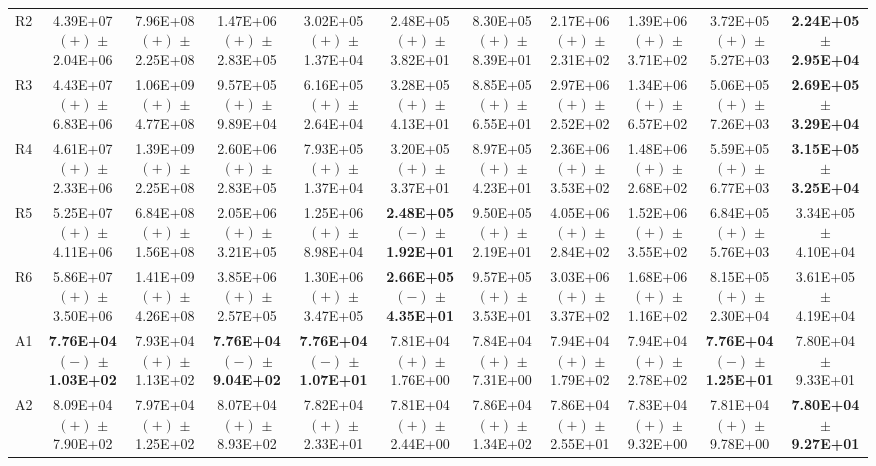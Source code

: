 \begin{table}[t]
{\begin{tabular}{l*{10}{c}}
R2 & 4.39E+07 $(+)$ $\pm$ 2.04E+06 & 7.96E+08 $(+)$ $\pm$ 2.25E+08 & 1.47E+06 $(+)$ $\pm$ 2.83E+05 & 3.02E+05 $(+)$ $\pm$ 1.37E+04 & 2.48E+05 $(+)$ $\pm$ 3.82E+01 & 8.30E+05 $(+)$ $\pm$ 8.39E+01 & 2.17E+06 $(+)$ $\pm$ 2.31E+02 & 1.39E+06 $(+)$ $\pm$ 3.71E+02 & 3.72E+05 $(+)$ $\pm$ 5.27E+03 & \textbf{2.24E+05 $\pm$ 2.95E+04} \\
R3 & 4.43E+07 $(+)$ $\pm$ 6.83E+06 & 1.06E+09 $(+)$ $\pm$ 4.77E+08 & 9.57E+05 $(+)$ $\pm$ 9.89E+04 & 6.16E+05 $(+)$ $\pm$ 2.64E+04 & 3.28E+05 $(+)$ $\pm$ 4.13E+01 & 8.85E+05 $(+)$ $\pm$ 6.55E+01 & 2.97E+06 $(+)$ $\pm$ 2.52E+02 & 1.34E+06 $(+)$ $\pm$ 6.57E+02 & 5.06E+05 $(+)$ $\pm$ 7.26E+03 & \textbf{2.69E+05 $\pm$ 3.29E+04} \\
R4 & 4.61E+07 $(+)$ $\pm$ 2.33E+06 & 1.39E+09 $(+)$ $\pm$ 2.25E+08 & 2.60E+06 $(+)$ $\pm$ 2.83E+05 & 7.93E+05 $(+)$ $\pm$ 1.37E+04 & 3.20E+05 $(+)$ $\pm$ 3.37E+01 & 8.97E+05 $(+)$ $\pm$ 4.23E+01 & 2.36E+06 $(+)$ $\pm$ 3.53E+02 & 1.48E+06 $(+)$ $\pm$ 2.68E+02 & 5.59E+05 $(+)$ $\pm$ 6.77E+03 & \textbf{3.15E+05 $\pm$ 3.25E+04} \\
R5 & 5.25E+07 $(+)$ $\pm$ 4.11E+06 & 6.84E+08 $(+)$ $\pm$ 1.56E+08 & 2.05E+06 $(+)$ $\pm$ 3.21E+05 & 1.25E+06 $(+)$ $\pm$ 8.98E+04 & \textbf{2.48E+05 $(-)$ $\pm$ 1.92E+01} & 9.50E+05 $(+)$ $\pm$ 2.19E+01 & 4.05E+06 $(+)$ $\pm$ 2.84E+02 & 1.52E+06 $(+)$ $\pm$ 3.55E+02 & 6.84E+05 $(+)$ $\pm$ 5.76E+03 & 3.34E+05 $\pm$ 4.10E+04 \\
R6 & 5.86E+07 $(+)$ $\pm$ 3.50E+06 & 1.41E+09 $(+)$ $\pm$ 4.26E+08 & 3.85E+06 $(+)$ $\pm$ 2.57E+05 & 1.30E+06 $(+)$ $\pm$ 3.47E+05 & \textbf{2.66E+05 $(-)$ $\pm$ 4.35E+01} & 9.57E+05 $(+)$ $\pm$ 3.53E+01 & 3.03E+06 $(+)$ $\pm$ 3.37E+02 & 1.68E+06 $(+)$ $\pm$ 1.16E+02 & 8.15E+05 $(+)$ $\pm$ 2.30E+04 & 3.61E+05 $\pm$ 4.19E+04 \\
\midrule
A1 & \textbf{7.76E+04 $(-)$ $\pm$ 1.03E+02} & 7.93E+04 $(+)$ $\pm$ 1.13E+02 & \textbf{7.76E+04 $(-)$ $\pm$ 9.04E+02} & \textbf{7.76E+04 $(-)$ $\pm$ 1.07E+01} & 7.81E+04 $(+)$ $\pm$ 1.76E+00 & 7.84E+04 $(+)$ $\pm$ 7.31E+00 & 7.94E+04 $(+)$ $\pm$ 1.79E+02 & 7.94E+04 $(+)$ $\pm$ 2.78E+02 & \textbf{7.76E+04 $(-)$ $\pm$ 1.25E+01} & 7.80E+04 $\pm$ 9.33E+01 \\
A2 & 8.09E+04 $(+)$ $\pm$ 7.90E+02 & 7.97E+04 $(+)$ $\pm$ 1.25E+02 & 8.07E+04 $(+)$ $\pm$ 8.93E+02 & 7.82E+04 $(+)$ $\pm$ 2.33E+01 & 7.81E+04 $(+)$ $\pm$ 2.44E+00 & 7.86E+04 $(+)$ $\pm$ 1.34E+02 & 7.86E+04 $(+)$ $\pm$ 2.55E+01 & 7.83E+04 $(+)$ $\pm$ 9.32E+00 & 7.81E+04 $(+)$ $\pm$ 9.78E+00 & \textbf{7.80E+04 $\pm$ 9.27E+01} \\

\end{tabular}}
\end{table}
